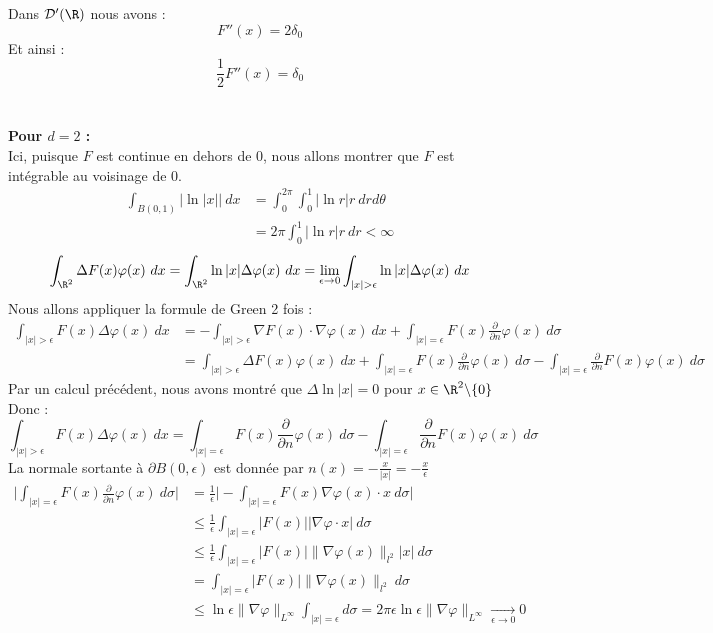 Dans $\mathcal{D}'(\R)$ nous avons :
$$ F''(x) = 2\delta_0 $$
Et ainsi :
$$ \frac{1}{2}F''(x) = \delta_0 $$\\
\\
\textbf{Pour $d = 2$ :}\\
Ici, puisque $F$ est continue en dehors de 0, nous allons montrer que $F$ est intégrable au voisinage de 0.
\begin{align*}
    \int_{B(0,1)} \big| \ln |x| \big| \ dx &= \int_{0}^{2\pi} \int_0^1 | \ln r | r \ dr d\theta \\
    &= 2\pi \int_0^1 |\ln r|r \ dr < \infty
\end{align*}
\begin{align*}
    \int_{\R^2} \Delta F(x) \varphi(x) \ dx = \int_{\R^2} \ln|x| \Delta \varphi(x) \ dx = \underset{\epsilon \to 0}{\lim} \int_{|x|>\epsilon} \ln |x| \Delta \varphi(x) \ dx 
\end{align*}
Nous allons appliquer la formule de Green 2 fois :
\begin{align*}
    \int_{|x| > \epsilon} F(x) \Delta \varphi(x) \ dx &= - \int_{|x|>\epsilon} \nabla F(x) \cdot \nabla \varphi(x) \ dx + \int_{|x| =\epsilon} F(x) \frac{\partial}{\partial n}\varphi(x) \ d\sigma \\
    &= \int_{|x|>\epsilon} \Delta F(x) \varphi(x) \ dx + \int_{|x| =\epsilon} F(x) \frac{\partial}{\partial n}\varphi(x) \ d\sigma - \int_{|x| =\epsilon}  \frac{\partial}{\partial n}F(x) \varphi(x) \ d\sigma
\end{align*}
Par un calcul précédent, nous avons montré que $\Delta \ln |x| = 0 $ pour $x \in \R^2 \backslash \{ 0 \}$
Donc :
$$ \int_{|x| > \epsilon} F(x) \Delta \varphi(x) \ dx = \int_{|x| =\epsilon} F(x) \frac{\partial}{\partial n}\varphi(x) \ d\sigma - \int_{|x| =\epsilon}  \frac{\partial}{\partial n}F(x) \varphi(x) \ d\sigma $$
La normale sortante à $\partial B(0,\epsilon)$ est donnée par $ \displaystyle n(x) = -\frac{x}{|x|} = - \frac{x}{\epsilon}$
\begin{align*}
    \bigg| \int_{|x|=\epsilon} F(x) \frac{\partial}{\partial n}\varphi(x) \ d\sigma \bigg| &= \frac{1}{\epsilon} \bigg| - \int_{|x|=\epsilon} F(x) \nabla \varphi(x) \cdot x \ d\sigma \bigg| \\
    &\leq \frac{1}{\epsilon} \int_{|x|=\epsilon} |F(x) | | \nabla \varphi \cdot x | \ d\sigma \\
    &\leq \frac{1}{\epsilon} \int_{|x|=\epsilon} |F(x)| \| \nabla \varphi(x) \|_{l^2} |x| \ d\sigma \\
    &= \int_{|x|=\epsilon} |F(x)| \|\nabla \varphi(x) \|_{l^2} \ d\sigma \\
    &\leq \ln \epsilon \| \nabla \varphi \|_{L^{\infty}} \int_{|x|=\epsilon} d\sigma = 2 \pi \epsilon \ln \epsilon \| \nabla \varphi \|_{L^{\infty}} \xrightarrow[\epsilon \to 0]{} 0
\end{align*}
